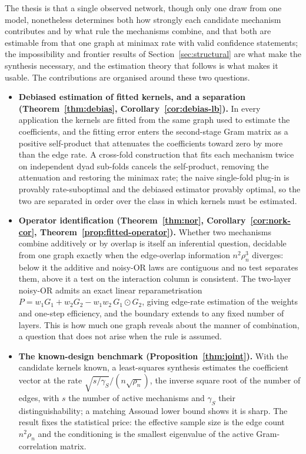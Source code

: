 \documentclass[12pt]{article}
\newcommand{\1}{\mathbf{1}}
\begin{document}
\label{sec:contrib}
The thesis is that a single observed network, though only one draw from one model, nonetheless determines both how strongly each candidate mechanism contributes and by what rule the mechanisms combine, and that both are estimable from that one graph at minimax rate with valid confidence statements; the impossibility and frontier results of Section~\ref{sec:structural} are what make the synthesis necessary, and the estimation theory that follows is what makes it usable. The contributions are organised around these two questions.

\begin{itemize}[leftmargin=1.4em,itemsep=3pt]
\item \textbf{Debiased estimation of fitted kernels, and a separation
(Theorem~\ref{thm:debias}, Corollary~\ref{cor:debias-lb}).} In every application the kernels are fitted from
the same graph used to estimate the coefficients, and the fitting error enters the second-stage Gram matrix as
a positive self-product that attenuates the coefficients toward zero by more than the edge rate. A cross-fold
construction that fits each mechanism twice on independent dyad sub-folds cancels the self-product, removing
the attenuation and restoring the minimax rate; the naive single-fold plug-in is provably rate-suboptimal and
the debiased estimator provably optimal, so the two are separated in order over the class in which kernels must
be estimated.

\item \textbf{Operator identification (Theorem~\ref{thm:nor}, Corollary~\ref{cor:nork-cor},
Theorem~\ref{prop:fitted-operator}).} Whether two mechanisms combine additively or by overlap is itself an
inferential question, decidable from one graph exactly when the edge-overlap information $n^2\rho_n^3$
diverges: below it the additive and noisy-OR laws are contiguous and no test separates them, above it a test on
the interaction column is consistent. The two-layer noisy-OR admits an exact linear reparametrisation
$P=w_1G_1+w_2G_2-w_1w_2\,G_1\!\odot\!G_2$, giving edge-rate estimation of the weights and one-step efficiency,
and the boundary extends to any fixed number of layers. This is how much one graph reveals about the manner of
combination, a question that does not arise when the rule is assumed.
\item \textbf{The known-design benchmark (Proposition~\ref{thm:joint}).}
With the candidate kernels known, a least-squares synthesis estimates the coefficient vector at the rate
$\sqrt{s/\gamma_S}/(n\sqrt{\rho_n})$, the inverse square root of the number of edges, with $s$ the number of
active mechanisms and $\gamma_S$ their distinguishability; a matching Assouad lower bound shows it is sharp.
The result fixes the statistical price: the effective sample size is the edge count $n^2\rho_n$ and the
conditioning is the smallest eigenvalue of the active Gram-correlation matrix.


\end{itemize}
\end{document}
